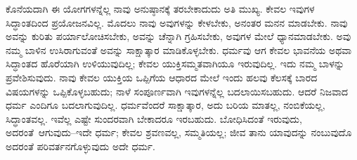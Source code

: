 ಕೊನೆಯದಾಗಿ ಈ ಯೋಗಗಳನ್ನೆಲ್ಲ ನಾವು ಅನುಷ್ಠಾನಕ್ಕೆ ತರಬೇಕಾದುದು ಅತಿ ಮುಖ್ಯ. ಕೇವಲ ಇವುಗಳ ಸಿದ್ಧಾಂತದಿಂದ ಪ್ರಯೋಜನವಿಲ್ಲ. ಮೊದಲು ನಾವು ಅವುಗಳನ್ನು ಕೇಳಬೇಕು, ಅನಂತರ ಮನನ ಮಾಡಬೇಕು. ನಾವು ಅವನ್ನು ಕುರಿತು ಪರ್ಯಾಲೋಚಿಸಬೇಕು, ಅವನ್ನು ಚೆನ್ನಾಗಿ ಗ್ರಹಿಸಬೇಕು, ಅವುಗಳ ಮೇಲೆ ಧ್ಯಾನಮಾಡಬೇಕು. ಅವು ನಮ್ಮ ಬಾಳಿನ ಉಸಿರಾಗುವಂತೆ ಅವನ್ನು ಸಾಕ್ಷಾತ್ಕಾರ ಮಾಡಿಕೊಳ್ಳಬೇಕು. ಧರ್ಮವು ಆಗ ಕೇವಲ ಭಾವನೆಯ ಅಥವಾ ಸಿದ್ಧಾಂತದ ಹೊರೆಯಾಗಿ ಉಳಿಯುವುದಿಲ್ಲ; ಕೇವಲ ಯುಕ್ತಿಸಮ್ಮತವಾಗಿಯೂ ಇರುವುದಿಲ್ಲ. ಇದು ನಮ್ಮ ಬಾಳನ್ನು ಪ್ರವೇಶಿಸುವುದು. ನಾವು ಕೇವಲ ಯುಕ್ತಿಯ ಒಪ್ಪಿಗೆಯ ಆಧಾರದ ಮೇಲೆ ಇಂದು ಹಲವು ಕೆಲಸಕ್ಕೆ ಬಾರದ ವಿಷಯಗಳನ್ನು ಒಪ್ಪಿಕೊಳ್ಳಬಹುದು; ನಾಳೆ ಸಂಪೂರ್ಣವಾಗಿ ಇವುಗಳನ್ನೆಲ್ಲ ಬದಲಾಯಿಸಬಹುದು. ಆದರೆ ನಿಜವಾದ ಧರ್ಮ ಎಂದಿಗೂ ಬದಲಾಗುವುದಿಲ್ಲ. ಧರ್ಮವೆಂದರೆ ಸಾಕ್ಷಾತ್ಕಾರ, ಅದು ಬರಿಯ ಮಾತಲ್ಲ, ನಂಬಿಕೆಯಲ್ಲ, ಸಿದ್ಧಾಂತವಲ್ಲ. ಇವೆಲ್ಲ ಎಷ್ಟೇ ಸುಂದರವಾಗಿ ಬೇಕಾದರೂ ಇರಬಹುದು. ಬೋಧಿಸಿದಂತೆ ಇರುವುದು, ಅದರಂತೆ\break\ ಆಗುವುದು–ಇದೇ ಧರ್ಮ; ಕೇವಲ ಶ್ರವಣವಲ್ಲ, ಸಮ್ಮತಿಯಲ್ಲ; ಜೀವ ತಾನು ಯಾವುದನ್ನು ನಂಬುವುದೊ ಅದರಂತೆ ಪರಿವರ್ತನಗೊಳ್ಳುವುದು ಅದೇ ಧರ್ಮ.

